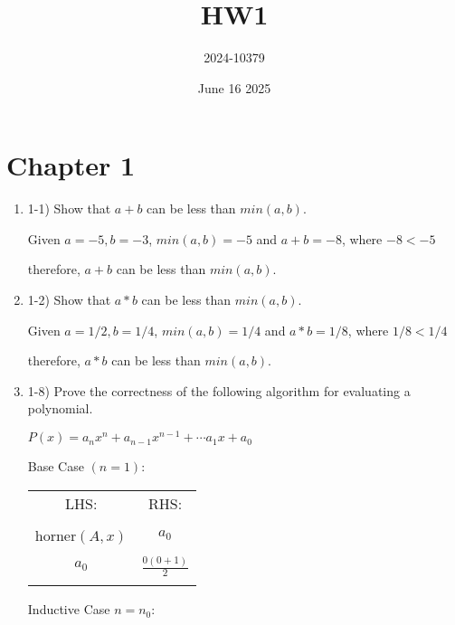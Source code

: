 \documentclass{article}
\title{HW1}
\author{2024-10379}
\date{June 16 2025}
\begin{document}
\maketitle

\section{Chapter 1}
\begin{enumerate}
    \item 1-1) Show that $a + b$ can be less than $min(a,b)$.
    
    Given $a = -5, b = -3$, $min(a,b) = -5$ and $a+b = -8$, where $-8 < -5$
    
    therefore, $a+b$ can be less than $min(a,b)$.
    
    \item 1-2) Show that $ a * b $ can be less than $min(a,b)$.
    
    Given $a = 1/2, b = 1/4$, $min(a,b) = 1/4$ and $a*b = 1/8$, where $1/8 < 1/4$
    
    therefore, $a*b$ can be less than $min(a,b)$.
    
    \item 1-8) Prove the correctness of the following algorithm for evaluating a polynomial.

    $P(x) = a_nx^n + a_{n-1}x^{n-1} + \cdots  a_1x + a_0$
    

    Base Case $(n = 1)$:
    \begin{center}
        \begin{tabular}{ c | c } 
        LHS: & RHS: \\ & \\
        horner$(A, x)$ & $ a_0$ \\ \\
        $ a_0 $ & $ \frac{0(0+1)}{2}$ \\ \\
        \end{tabular}
    \end{center}
    Inductive Case $ n = n_0 $:
    

\end{enumerate}
\end{document}
